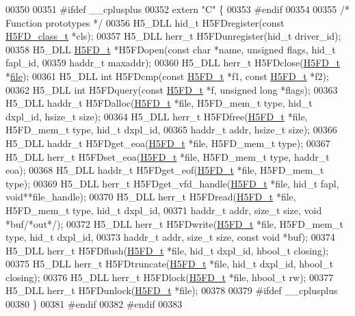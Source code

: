 \begin{DoxyCode}
00350 
00351 \textcolor{preprocessor}{#ifdef \_\_cplusplus}
00352 \textcolor{keyword}{extern} \textcolor{stringliteral}{"C"} \{
00353 \textcolor{preprocessor}{#endif}
00354 
00355 \textcolor{comment}{/* Function prototypes */}
00356 H5\_DLL hid\_t H5FDregister(\textcolor{keyword}{const} \hyperlink{struct_h5_f_d__class__t}{H5FD\_class\_t} *cls);
00357 H5\_DLL herr\_t H5FDunregister(hid\_t driver\_id);
00358 H5\_DLL \hyperlink{struct_h5_f_d__t}{H5FD\_t} *H5FDopen(\textcolor{keyword}{const} \textcolor{keywordtype}{char} *name, \textcolor{keywordtype}{unsigned} flags, hid\_t fapl\_id,
00359                         haddr\_t maxaddr);
00360 H5\_DLL herr\_t H5FDclose(\hyperlink{struct_h5_f_d__t}{H5FD\_t} *\hyperlink{structfile}{file});
00361 H5\_DLL \textcolor{keywordtype}{int} H5FDcmp(\textcolor{keyword}{const} \hyperlink{struct_h5_f_d__t}{H5FD\_t} *f1, \textcolor{keyword}{const} \hyperlink{struct_h5_f_d__t}{H5FD\_t} *f2);
00362 H5\_DLL \textcolor{keywordtype}{int} H5FDquery(\textcolor{keyword}{const} \hyperlink{struct_h5_f_d__t}{H5FD\_t} *f, \textcolor{keywordtype}{unsigned} \textcolor{keywordtype}{long} *flags);
00363 H5\_DLL haddr\_t H5FDalloc(\hyperlink{struct_h5_f_d__t}{H5FD\_t} *file, H5FD\_mem\_t type, hid\_t dxpl\_id, hsize\_t size);
00364 H5\_DLL herr\_t H5FDfree(\hyperlink{struct_h5_f_d__t}{H5FD\_t} *file, H5FD\_mem\_t type, hid\_t dxpl\_id,
00365                        haddr\_t addr, hsize\_t size);
00366 H5\_DLL haddr\_t H5FDget\_eoa(\hyperlink{struct_h5_f_d__t}{H5FD\_t} *file, H5FD\_mem\_t type);
00367 H5\_DLL herr\_t H5FDset\_eoa(\hyperlink{struct_h5_f_d__t}{H5FD\_t} *file, H5FD\_mem\_t type, haddr\_t eoa);
00368 H5\_DLL haddr\_t H5FDget\_eof(\hyperlink{struct_h5_f_d__t}{H5FD\_t} *file, H5FD\_mem\_t type);
00369 H5\_DLL herr\_t H5FDget\_vfd\_handle(\hyperlink{struct_h5_f_d__t}{H5FD\_t} *file, hid\_t fapl, \textcolor{keywordtype}{void}**file\_handle);
00370 H5\_DLL herr\_t H5FDread(\hyperlink{struct_h5_f_d__t}{H5FD\_t} *file, H5FD\_mem\_t type, hid\_t dxpl\_id,
00371                        haddr\_t addr, \textcolor{keywordtype}{size\_t} size, \textcolor{keywordtype}{void} *buf\textcolor{comment}{/*out*/});
00372 H5\_DLL herr\_t H5FDwrite(\hyperlink{struct_h5_f_d__t}{H5FD\_t} *file, H5FD\_mem\_t type, hid\_t dxpl\_id,
00373                         haddr\_t addr, \textcolor{keywordtype}{size\_t} size, \textcolor{keyword}{const} \textcolor{keywordtype}{void} *buf);
00374 H5\_DLL herr\_t H5FDflush(\hyperlink{struct_h5_f_d__t}{H5FD\_t} *file, hid\_t dxpl\_id, hbool\_t closing);
00375 H5\_DLL herr\_t H5FDtruncate(\hyperlink{struct_h5_f_d__t}{H5FD\_t} *file, hid\_t dxpl\_id, hbool\_t closing);
00376 H5\_DLL herr\_t H5FDlock(\hyperlink{struct_h5_f_d__t}{H5FD\_t} *file, hbool\_t rw);
00377 H5\_DLL herr\_t H5FDunlock(\hyperlink{struct_h5_f_d__t}{H5FD\_t} *file);
00378 
00379 \textcolor{preprocessor}{#ifdef \_\_cplusplus}
00380 \}
00381 \textcolor{preprocessor}{#endif}
00382 \textcolor{preprocessor}{#endif}
00383 
\end{DoxyCode}
